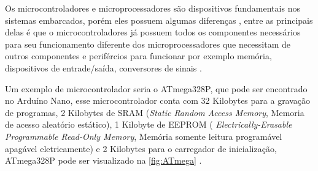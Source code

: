     \par
    Os microcontroladores e microprocessadores são dispositivos fundamentais nos sistemas embarcados, porém eles possuem algumas diferenças , entre as principais delas é que o microcontroladores já possuem todos os componentes necessários para seu funcionamento diferente dos microprocessadores que necessitam de outros componentes e perifércios para funcionar por exemplo memória, dispositivos de entrade/saída, conversores de sinais \cite{ayala:1991}.  
    
    \par
    Um exemplo de microcontrolador seria o ATmega328P, que pode ser encontrado no Arduíno Nano, esse microcontrolador conta com 32 Kilobytes para a gravação de programas, 2 Kilobytes de SRAM (\textit{Static Random Access Memory}, Memoria de acesso aleatório estático), 1 Kilobyte de EEPROM ( \textit{Electrically-Erasable Programmable Read-Only Memory}, Memória somente leitura programável apagável eletricamente) e 2 Kilobytes para o carregador de inicialização, ATmega328P pode ser visualizado na \autoref{fig:ATmega} \cite{arduino}. 

